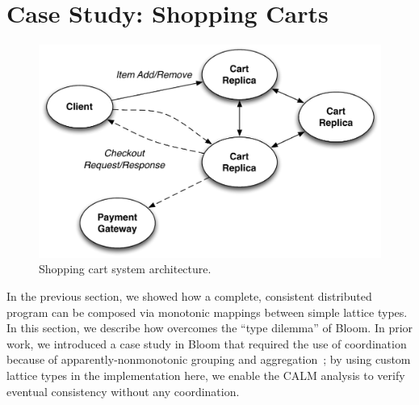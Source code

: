 \section{Case Study: Shopping Carts}
\label{sec:carts}

\begin{figure}[t]
\centering
\includegraphics[width=\linewidth]{fig/cart_arch.pdf}
\caption{Shopping cart system architecture.}
\label{fig:cart-system-arch}
\end{figure}

In the previous section, we showed how a complete, consistent distributed
program can be composed via monotonic mappings between simple lattice types. In
this section, we describe how \lang overcomes the ``type dilemma'' of Bloom. In
prior work, we introduced a case study in Bloom that required the use of
coordination because of apparently-nonmonotonic grouping and
aggregation~\cite{Alvaro2011}; by using custom lattice types in the
implementation here, we enable the \lang CALM analysis to verify eventual
consistency without any coordination.


% 

